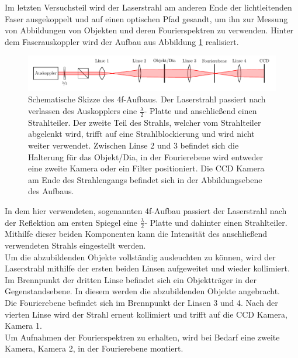 

Im letzten Versuchsteil wird der Laserstrahl am anderen Ende der lichtleitenden Faser ausgekoppelt und auf einen optischen Pfad gesandt, um ihn zur Messung von Abbildungen von Objekten und deren Fourierspektren zu verwenden.
Hinter dem Faserauskoppler wird der Aufbau aus Abbildung \ref{fig:4f-aufbau} realisiert. \\

\begin{figure}[h]
\centering
\includegraphics[width=0.7\linewidth]{graphs/versuchsaufbau/4f-aufbau}
\caption{Schematische Skizze des 4f-Aufbaus. Der Laserstrahl passiert nach verlassen des Auskopplers eine $\frac{\lambda}{2}$- Platte und anschließend einen Strahlteiler. Der zweite Teil des Strahls, welcher vom Strahlteiler abgelenkt wird, trifft auf eine Strahlblockierung und wird nicht weiter verwendet. Zwischen Linse 2 und 3 befindet sich die Halterung für das Objekt/Dia, in der Fourierebene wird entweder eine zweite Kamera oder ein Filter positioniert. Die CCD Kamera am Ende des Strahlengangs befindet sich in der Abbildungsebene des Aufbaus.}
\label{fig:4f-aufbau}
\end{figure}

In dem hier verwendeten, sogenannten 4f-Aufbau passiert der Laserstrahl nach der Reflektion am ersten Spiegel eine $\frac{\lambda}{2}$- Platte und dahinter einen Strahlteiler. Mithilfe dieser beiden Komponenten kann die Intensität des anschließend verwendeten Strahls eingestellt werden. \\
Um die abzubildenden Objekte vollständig ausleuchten zu können, wird der Laserstrahl mithilfe der ersten beiden Linsen aufgeweitet und wieder kollimiert. Im Brennpunkt der dritten Linse befindet sich ein Objektträger in der Gegenstandsebene. In diesem werden die abzubildenden Objekte angebracht. \\
Die Fourierebene befindet sich im Brennpunkt der Linsen 3 und 4. Nach der vierten Linse wird der Strahl erneut kollimiert und trifft auf die CCD Kamera, Kamera 1. \\
Um Aufnahmen der Fourierspektren zu erhalten, wird bei Bedarf eine zweite Kamera, Kamera 2, in der Fourierebene montiert. \\ 

